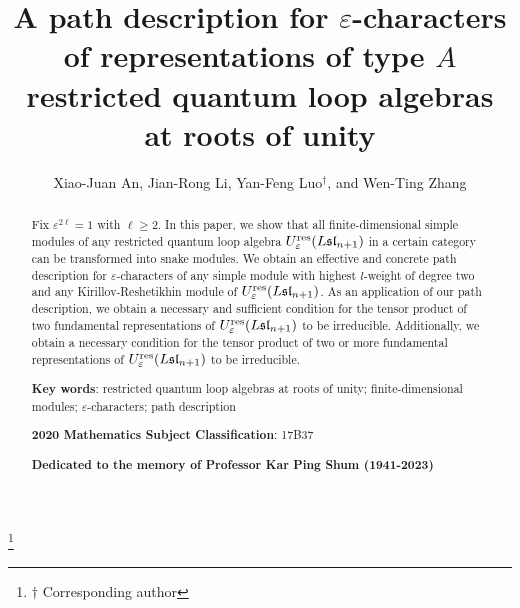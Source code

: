 \documentclass[12pt, reqno]{amsart}
\numberwithin{equation}{section}
\newcommand{\res}{{\rm res}}
\begin{document}
\title[A path description for $\varepsilon$-characters of simple modules]{A path description for $\varepsilon$-characters of representations of type $A$ restricted quantum loop algebras at roots of unity}
\author{Xiao-Juan An, Jian-Rong Li, Yan-Feng Luo$^\dag$, and Wen-Ting Zhang}\thanks{$\dag$ Corresponding author}

\address{Xiao-Juan An: School of Mathematics and Statistics, Lanzhou University, Lanzhou 730000, P. R. China.}

\address{Jian-Rong Li: Faculty of Mathematics, University of Vienna, Oskar-Morgenstern Platz 1, 1090 Vienna, Austria}

\address{Yan-Feng Luo: School of Mathematics and Statistics, Lanzhou University, Lanzhou 730000, P. R. China.}


\address{Wen-Ting Zhang: School of Mathematics and Statistics, Lanzhou University, Lanzhou 730000, P. R. China.}
\date{}

\begin{abstract}
Fix $\varepsilon^{2\ell}=1$ with $\ell \geq 2$. In this paper, we show that all finite-dimensional simple modules of any restricted quantum loop algebra $U_{\varepsilon}^{\res}({L\mathfrak{sl}_{n+1}})$ in a certain category can be transformed into snake modules. We obtain an effective and concrete path description for $\varepsilon$-characters of any simple module with highest $l$-weight of degree two and any Kirillov-Reshetikhin module of $U_{\varepsilon}^{\res}({L\mathfrak{sl}_{n+1}})$. As an application of our path description, we obtain a necessary and sufficient condition for the tensor product of two fundamental representations of $U_{\varepsilon}^{\res}({L\mathfrak{sl}_{n+1}})$ to be irreducible. Additionally, we obtain a necessary condition for the tensor product of two or more fundamental representations of $U_{\varepsilon}^{\res}({L\mathfrak{sl}_{n+1}})$ to be irreducible.

\hspace{0.15cm}

\noindent
{\bf Key words}: restricted quantum loop algebras at roots of unity; finite-dimensional modules; $\varepsilon$-characters; path description

\hspace{0.15cm}

\noindent
{\bf 2020 Mathematics Subject Classification}: 17B37

\vskip 0.2in

{\bf Dedicated to the memory of Professor Kar Ping Shum (1941-2023)}
\end{abstract}
\end{document}

